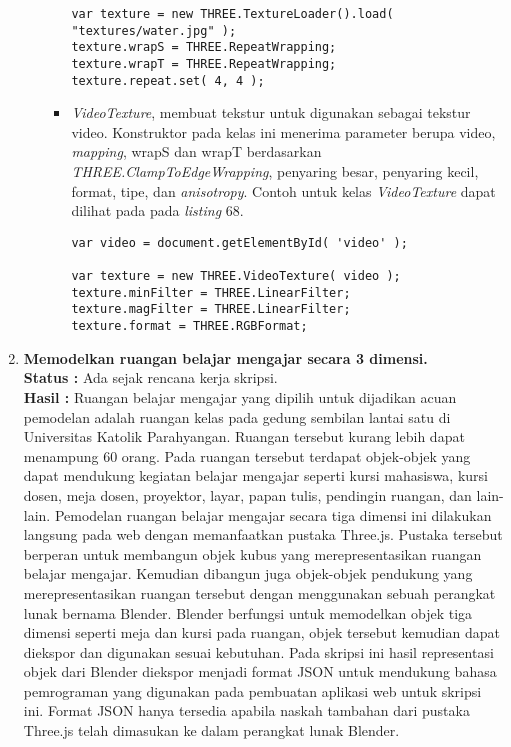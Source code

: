 \documentclass[a4paper,twoside]{article}
\begin{document}
\begin{enumerate}
\begin{itemize}
\begin{itemize}
\begin{lstlisting}[caption={Contoh penggunaan kelas {\it Texture}.},captionpos=b]
var texture = new THREE.TextureLoader().load( "textures/water.jpg" );
texture.wrapS = THREE.RepeatWrapping;
texture.wrapT = THREE.RepeatWrapping;
texture.repeat.set( 4, 4 );
\end{lstlisting}
	
	\item{\it VideoTexture}, membuat tekstur untuk digunakan sebagai tekstur video. Konstruktor pada kelas ini menerima parameter berupa video, {\it mapping},  wrapS dan wrapT berdasarkan {\it THREE.ClampToEdgeWrapping}, penyaring besar, penyaring kecil, format, tipe, dan {\it anisotropy}. Contoh untuk kelas {\it VideoTexture} dapat dilihat pada pada {\it listing} 68.
	
\begin{lstlisting}[caption={Contoh penggunaan kelas {\it VideoTexture}.},captionpos=b]
var video = document.getElementById( 'video' );

var texture = new THREE.VideoTexture( video );
texture.minFilter = THREE.LinearFilter;
texture.magFilter = THREE.LinearFilter;
texture.format = THREE.RGBFormat;
\end{lstlisting}
	
	\end{itemize}	
	
\end{itemize}

		\item \textbf{Memodelkan ruangan belajar mengajar secara 3 dimensi.}\\
		{\bf Status :} Ada sejak rencana kerja skripsi.\\
		{\bf Hasil :} Ruangan belajar mengajar yang dipilih untuk dijadikan acuan pemodelan adalah ruangan kelas pada gedung sembilan lantai satu di Universitas Katolik Parahyangan. Ruangan tersebut kurang lebih dapat menampung 60 orang. Pada ruangan tersebut terdapat objek-objek yang dapat mendukung kegiatan belajar mengajar seperti kursi mahasiswa, kursi dosen, meja dosen, proyektor, layar, papan tulis, pendingin ruangan, dan lain-lain. Pemodelan ruangan belajar mengajar secara tiga dimensi ini dilakukan langsung pada web dengan memanfaatkan pustaka Three.js. Pustaka tersebut berperan untuk membangun objek kubus yang merepresentasikan ruangan belajar mengajar. Kemudian dibangun juga objek-objek pendukung yang merepresentasikan ruangan tersebut dengan menggunakan sebuah perangkat lunak bernama Blender. Blender berfungsi untuk memodelkan objek tiga dimensi seperti meja dan kursi pada ruangan, objek tersebut kemudian dapat diekspor dan digunakan sesuai kebutuhan. Pada skripsi ini hasil representasi objek dari Blender diekspor menjadi format JSON untuk mendukung bahasa pemrograman yang digunakan pada pembuatan aplikasi web untuk skripsi ini. Format JSON hanya tersedia apabila naskah tambahan dari pustaka Three.js telah dimasukan ke dalam perangkat lunak Blender.


\end{enumerate}
\end{document}
